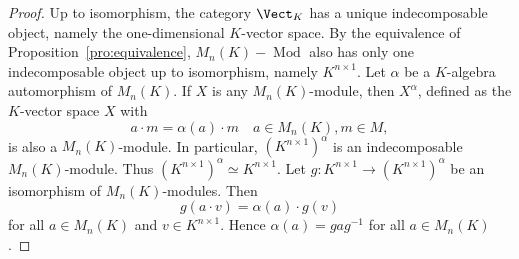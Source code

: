 \begin{proof}
    Up to isomorphism, the category $\Vect_K$ has a unique indecomposable object, namely 
    the one-dimensional $K$-vector space. By the equivalence
    of Proposition~\ref{pro:equivalence}, 
    $M_n(K)-\operatorname{Mod}$ also has only one
    indecomposable object up to isomorphism, namely 
    $K^{n\times 1}$. 
    Let $\alpha$ be a $K$-algebra automorphism 
    of $M_n(K)$. If $X$ is any $M_n(K)$-module, 
    then $X^{\alpha}$, defined as 
    the $K$-vector space $X$ 
    with 
    \[
    a\cdot m=\alpha(a)\cdot m\quad a\in M_n(K),m\in M,
    \]
    is also a $M_n(K)$-module. In particular, 
    $(K^{n\times 1})^\alpha$ is an indecomposable 
    $M_n(K)$-module. Thus $(K^{n\times 1})^\alpha\simeq K^{n\times1}$. Let $g\colon K^{n\times 1}\to (K^{n\times 1})^\alpha$ be an 
    isomorphism of $M_n(K)$-modules. Then 
    \[
    g(a\cdot v)=\alpha(a)\cdot g(v)
    \]
    for all $a\in M_n(K)$ and $v\in K^{n\times 1}$. Hence 
    $\alpha(a)=gag^{-1}$ for all $a\in M_n(K)$. 
\end{proof}


